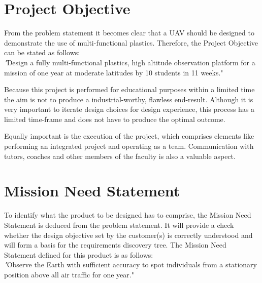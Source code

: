 \documentclass[a4paper]{report}
\begin{document}
\section{Project Objective}
\label{sec:ProjectObjective}
From the problem statement it becomes clear that a UAV should be designed to demonstrate the use of multi-functional plastics. Therefore, the Project Objective can be stated as follows:\\
{\textit "Design a fully multi-functional plastics, high altitude observation platform for a mission of one year at moderate latitudes by 10 students in 11 weeks."}

Because this project is performed for educational purposes within a limited time the aim is not to produce a industrial-worthy, flawless end-result. Although it is very important to iterate design choices for design experience, this process has a limited time-frame and does not have to produce the optimal outcome.

Equally important is the execution of the project, which comprises elements like performing an integrated project and operating as a team. Communication with tutors, coaches and other members of the faculty is also a valuable aspect.
\section{Mission Need Statement}
\label{sec:MissionNeedStatement}
To identify what the product to be designed has to comprise, the Mission Need Statement is deduced from the problem statement. It will provide a check whether the design objective set by the customer(s) is correctly understood and will form a basis for the requirements discovery tree. The Mission Need Statement defined for this product is as follows:\\
{\textit "Observe the Earth with sufficient accuracy to spot individuals from a stationary position above all air traffic for one year."}
\end{document}
